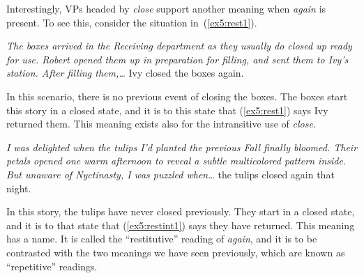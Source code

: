 Interestingly, VPs headed by \emph{close} support another meaning when \emph{again} is present. To see this, consider the situation in~(\ref{ex5:rest1}).
\begin{exe}
	\raggedright
	\sn \emph{The boxes arrived in the Receiving department as they usually do closed up ready for use. Robert opened them up in preparation for filling, and sent them to Ivy's station. After filling them,\ldots}
	\ex \label{ex5:rest1} Ivy closed the boxes again.
\end{exe}
In this scenario, there is no previous event of closing the boxes. The boxes start this story in a closed state, and it is to this state that (\ref{ex5:rest1}) says Ivy returned them. This meaning exists also for the intransitive use of \emph{close}. 
\begin{exe}
	\raggedright
	\sn \emph{I was delighted when the tulips I'd planted the previous Fall finally bloomed. Their petals opened one warm afternoon to reveal a subtle multicolored pattern inside. But unaware of Nyctinasty, I was puzzled when\ldots}
	\ex \label{ex5:restint1} the tulips closed again that night.
\end{exe}
In this story, the tulips have never closed previously. They start in a closed state, and it is to that state that (\ref{ex5:restint1}) says they have returned. This meaning has a name. It is called the ``restitutive'' reading of \emph{again}, and it is to be contrasted with the two meanings we have seen previously, which are known as ``repetitive'' readings.%
%

